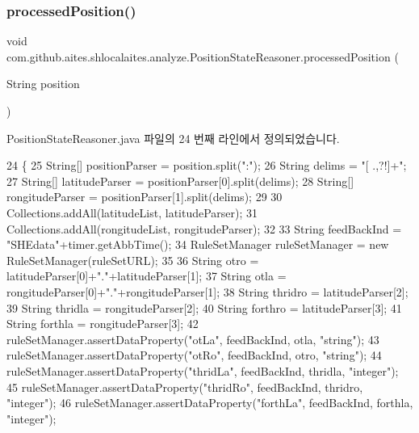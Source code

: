 \subsubsection{\texorpdfstring{processed\+Position()}{processedPosition()}}
{\footnotesize\ttfamily void com.\+github.\+aites.\+shlocalaites.\+analyze.\+Position\+State\+Reasoner.\+processed\+Position (\begin{DoxyParamCaption}\item[{String}]{position }\end{DoxyParamCaption})\hspace{0.3cm}{\ttfamily [private]}}



Position\+State\+Reasoner.\+java 파일의 24 번째 라인에서 정의되었습니다.


\begin{DoxyCode}
24                                                    \{
25         String[] positionParser = position.split(\textcolor{stringliteral}{":"});
26         String delims = \textcolor{stringliteral}{"[ .,?!]+"};
27         String[] latitudeParser = positionParser[0].split(delims);
28         String[] rongitudeParser = positionParser[1].split(delims);
29         
30         Collections.addAll(latitudeList, latitudeParser);
31         Collections.addAll(rongitudeList, rongitudeParser);
32 
33         String feedBackInd = \textcolor{stringliteral}{"SHEdata"}+timer.getAbbTime();
34         RuleSetManager ruleSetManager = \textcolor{keyword}{new} RuleSetManager(ruleSetURL);
35         
36         String otro = latitudeParser[0]+\textcolor{stringliteral}{"."}+latitudeParser[1];
37         String otla = rongitudeParser[0]+\textcolor{stringliteral}{"."}+rongitudeParser[1];
38         String thridro = latitudeParser[2];
39         String thridla = rongitudeParser[2];
40         String forthro = latitudeParser[3];
41         String forthla = rongitudeParser[3];
42         ruleSetManager.assertDataProperty(\textcolor{stringliteral}{"otLa"}, feedBackInd, otla, \textcolor{stringliteral}{"string"});
43         ruleSetManager.assertDataProperty(\textcolor{stringliteral}{"otRo"}, feedBackInd, otro, \textcolor{stringliteral}{"string"});
44         ruleSetManager.assertDataProperty(\textcolor{stringliteral}{"thridLa"}, feedBackInd, thridla, \textcolor{stringliteral}{"integer"});
45         ruleSetManager.assertDataProperty(\textcolor{stringliteral}{"thridRo"}, feedBackInd, thridro, \textcolor{stringliteral}{"integer"});
46         ruleSetManager.assertDataProperty(\textcolor{stringliteral}{"forthLa"}, feedBackInd, forthla, \textcolor{stringliteral}{"integer"});

\end{DoxyCode}
